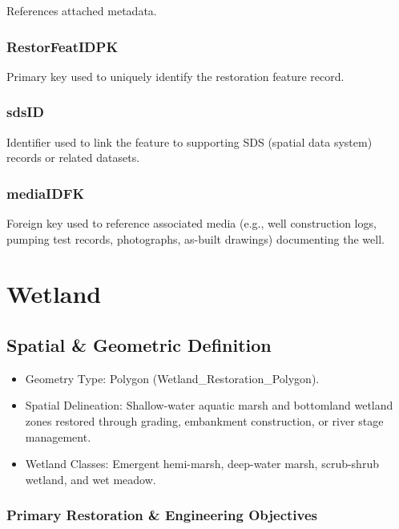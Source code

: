 \documentclass[
  letterpaper,
  DIV=11,
  numbers=noendperiod]{scrreprt}
\begin{document}
References attached metadata.

\subsection{RestorFeatIDPK}\label{restorfeatidpk-15}

Primary key used to uniquely identify the restoration feature record.

\subsection{sdsID}\label{sdsid-15}

Identifier used to link the feature to supporting SDS (spatial data
system) records or related datasets.

\subsection{mediaIDFK}\label{mediaidfk-15}

Foreign key used to reference associated media (e.g., well construction
logs, pumping test records, photographs, as-built drawings) documenting
the well.

\chapter{Wetland}\label{wetland}

\section{Spatial \& Geometric
Definition}\label{spatial-geometric-definition-16}

\begin{itemize}
\item
  Geometry Type: Polygon (Wetland\_Restoration\_Polygon).
\item
  Spatial Delineation: Shallow-water aquatic marsh and bottomland
  wetland zones restored through grading, embankment construction, or
  river stage management.
\item
  Wetland Classes: Emergent hemi-marsh, deep-water marsh, scrub-shrub
  wetland, and wet meadow.
\end{itemize}

\subsection{Primary Restoration \& Engineering
Objectives}\label{primary-restoration-engineering-objectives-15}
\end{document}
